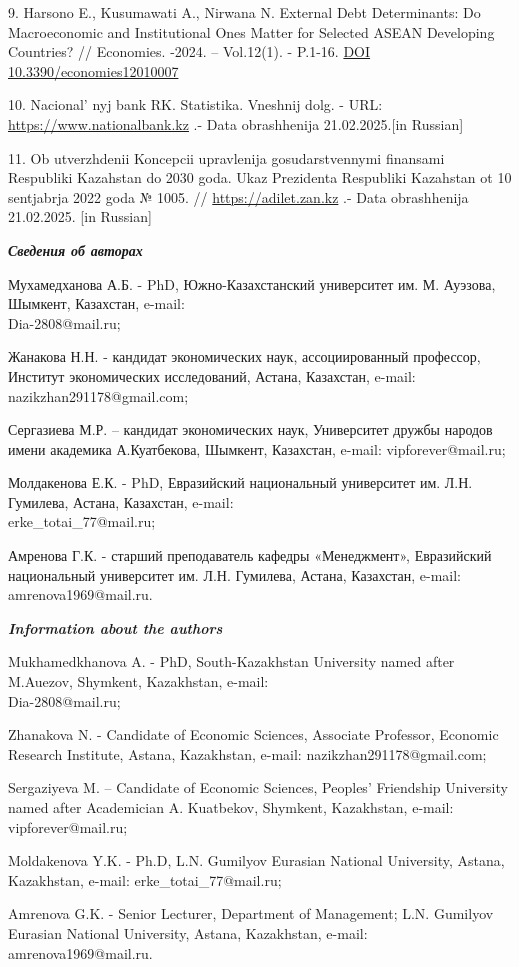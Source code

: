 \begin{references}
9. Harsono E., Kusumawati A., Nirwana N. External Debt Determinants: Do
Macroeconomic and Institut\-ional Ones Matter for Selected ASEAN
Developing Countries? // Economies. -2024. -- Vol.12(1). - P.1-16.
\href{https://doi.org/10.3390/economies12010007}{DOI
10.3390/economies12010007}

10. Nacional' nyj bank RK. Statistika. Vneshnij dolg. -
URL: \href{https://www.nationalbank.kz/ru/news/vneshniy-dolg}{https://www.nationalbank.kz}
.- Data obrash\-henija 21.02.2025.{[}in Russian{]}

11. Ob utverzhdenii Koncepcii upravlenija gosudarstvennymi finansami
Respubliki Kazahstan do 2030 goda. Ukaz Prezidenta Respubliki Kazahstan
ot 10 sentjabrja 2022 goda № 1005. //
\href{https://adilet.zan.kz/rus/docs/U2200001005}{https://adilet.zan.kz} .- Data obrashhenija
21.02.2025. {[}in Russian{]}
\end{references}

\begin{authorinfo}
\hspace{1em}\emph{{\bfseries Сведения об авторах}}

Мухамедханова А.Б. - PhD, Южно-Казахстанский университет им. М. Ауэзова,
Шымкент, Казахстан, e-mail: \\Dia-2808@mail.ru;

Жанакова Н.Н. - кандидат экономических наук, ассоциированный профессор,
Институт экономических исследований, Астана, Казахстан, e-mail:
nazikzhan291178@gmail.com;

Сергазиева М.Р. -- кандидат экономических наук, Университет дружбы
народов имени академика А.Куатбекова, Шымкент, Казахстан, e-mail:
vipforever@mail.ru;

Молдакенова Е.К. - PhD, Евразийский национальный университет им. Л.Н.
Гумилева, Астана, Казахстан, e-mail:\\
erke\_totai\_77@mail.ru;

Амренова Г.К. - старший преподаватель кафедры «Менеджмент», Евразийский
национальный университет им. Л.Н. Гумилева, Астана, Казахстан, e-mail:
amrenova1969@mail.ru.

\hspace{1em}\emph{{\bfseries Information about the authors}}

Mukhamedkhanova A. - PhD, South-Kazakhstan University named after
M.Auezov, Shymkent, Kazakhstan, e-mail: \\Dia-2808@mail.ru;

Zhanakova N. - Candidate of Economic Sciences, Associate Professor,
Economic Research Institute, Astana, Kazakhstan, e-mail:
nazikzhan291178@gmail.com;

Sergaziyeva M. -- Candidate of Economic Sciences,
Peoples'{} Friendship University named after Academician
A. Kuatbekov, Shymkent, Kazakhstan, e-mail: vipforever@mail.ru;

Moldakenova Y.K. - Ph.D, L.N. Gumilyov Eurasian National University,
Astana, Kazakhstan, e-mail: erke\_totai\_77@mail.ru;

Amrenova G.K. - Senior Lecturer, Department of Management; L.N. Gumilyov
Eurasian National University, Astana, Kazakh\-stan, e-mail:
amrenova1969@mail.ru.
\end{authorinfo}
